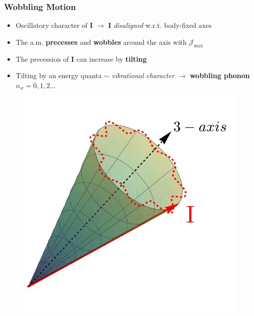 \documentclass{beamer}
\begin{document}
\begin{frame}
  \frametitle{Wobbling Motion}
\begin{itemize}
  \item Oscillatory character of $\mathbf{I}$ $\rightarrow$ $\mathbf{I}$ \emph{disaligned} w.r.t. body-fixed axes
  \item The a.m. \textbf{precesses} and \textbf{wobbles} around the axis with $\mathcal{J}_\text{max}$
  \item The precession of $\mathbf{I}$ can increase by \textbf{tilting} 
  \item Tilting by an energy quanta $\sim$ \emph{vibrational character} $\rightarrow$ \textbf{wobbling phonon} $n_w=0,1,2...$
\end{itemize}
  \begin{figure}
    \centering
    \includegraphics[scale=0.39]{Figs/precessional_cone_2.pdf}

\end{figure}
\end{frame}
\end{document}
